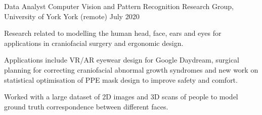 
\begin{cventries}
  \cventry
    {Data Analyst} %
    {Computer Vision and Pattern Recognition Research Group, University of York} %
    {York (remote)} %
    {July 2020} %
    {
      \begin{cvitems} %
         \item {Research related to modelling the human head, face, ears and eyes for applications in craniofacial surgery and ergonomic design.}
         \vspace{0.5mm}
         \item {Applications include VR/AR eyewear design for Google Daydream, surgical planning for correcting craniofacial abnormal growth syndromes and new work on statistical optimisation of PPE mask design to improve safety and comfort.}
         \vspace{0.5mm}
         \item{Worked with a large dataset of 2D images and 3D scans of people to model ground truth correspondence between different faces.}
      \end{cvitems}
    }
\end{cventries}